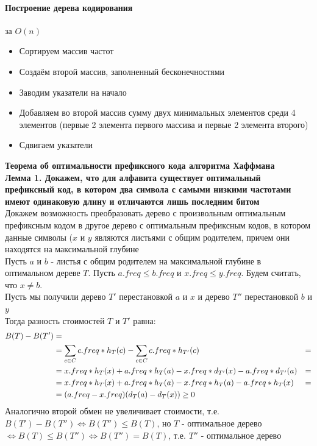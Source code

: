 \documentclass[a4paper,10pt]{article}
\begin{document}
\paragraph{Построение дерева кодирования} за $O(n)$
\begin{itemize}
	\item Сортируем массив частот
	\item Создаём второй массив, заполненный бесконечностями
	\item Заводим указатели на начало
	\item Добавляем во второй массив сумму двух минимальных элементов среди 4 элементов (первые 2 элемента первого массива и первые 2 элемента второго)
	\item Сдвигаем указатели
\end{itemize}
\textbf{Теорема об оптимальности префиксного кода алгоритма Хаффмана} \\
\textbf{Лемма 1. Докажем, что для алфавита существует оптимальный префиксный код, в котором два символа с самыми низкими частотами имеют одинаковую длину и отличаются лишь последним битом} \\
Докажем возможность преобразовать дерево с произвольным оптимальным префиксным кодом в другое дерево с оптимальным префиксным кодов, в котором данные символы ($x$ и $y$ являются листьями с общим родителем, причем они находятся на максимальной глубине \\
Пусть $a$ и $b$ - листья с общим родителем на максимальной глубине в оптимальном дереве $T$. Пусть $a.freq \leq b.freq$ и $x.freq \leq y.freq$. Будем считать, что $x \neq b$. \\
Пусть мы получили дерево $T'$ перестановкой $a$ и $x$ и дерево $T''$ перестановкой $b$ и $y$ \\
Тогда разность стоимостей $T$ и $T'$ равна:
\begin{align}
	B(T) - B(T') &= \notag\\
	&= \sum_{c \in C} c.freq*h_T (c) - \sum_{c \in C} c.freq*h_{T'} (c) &= \notag\\ 
	&= x.freq * h_T(x) + a.freq * h_T(a) - x.freq * d_{T'}(x) - a.freq * d_{T'}(a) &= \notag\\
	&= x.freq * h_T(x) + a.freq * h_T(a) - x.freq * h_T(a) - a.freq * h_T(x) &= \notag\\
	&= (a.freq - x.freq)(d_T(a) - d_T(x)) \geq 0 \notag
\end{align}
Аналогично второй обмен не увеличивает стоимости, т.е. $B(T') - B(T'') \Leftrightarrow B(T'') \leq B(T) $, но $T$ - оптимальное дерево $\Leftrightarrow B(T) \leq B(T'') \Leftrightarrow B(T'') = B(T)$, т.е. $T''$ - оптимальное дерево
\end{document}
